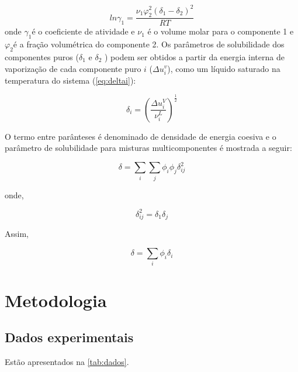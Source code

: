 \begin{equation}\label{eq:lngamma1}
ln\gamma_1 = \frac{\nu_1\varphi_2^2(\delta_1-\delta_2)^2}{RT}
\end{equation}
onde $\gamma_1$é o coeficiente de atividade e $\nu_1$ é o volume molar para o
componente 1 e $\varphi_2$é a fração volumétrica do componente 2. Os parâmetros
de solubilidade dos componentes puros ($\delta_1$ e $\delta_2$ ) podem ser
obtidos a partir da energia interna de vaporização de cada componente puro $i$
($\Delta u_i^v$), como um líquido saturado na temperatura do sistema
(\autoref{eq:deltai}):

\begin{equation}\label{eq:deltai}
\delta_i = \left ( \frac{\Delta u_i^V}{\nu_i^L} \right )^{\frac{1}{2}}
\end{equation}

O termo entre parânteses é denominado de densidade de energia coesiva e o
parâmetro de solubilidade para misturas multicomponentes é mostrada a seguir:

\begin{equation}\label{eq:delta}
\delta = \sum_i\sum_j\phi_i\phi_j\delta_{ij}^2
\end{equation}

onde,

\begin{equation}\label{eq:deltaij}
\delta_{ij}^2 = \delta_1\delta_j
\end{equation}

Assim,

\begin{equation}\label{eq:delta2}
\delta = \sum_i\phi_i\delta_i
\end{equation}

\clearpage
\section{Metodologia}

\subsection{Dados experimentais}

Estão apresentados na \autoref{tab:dados}.

